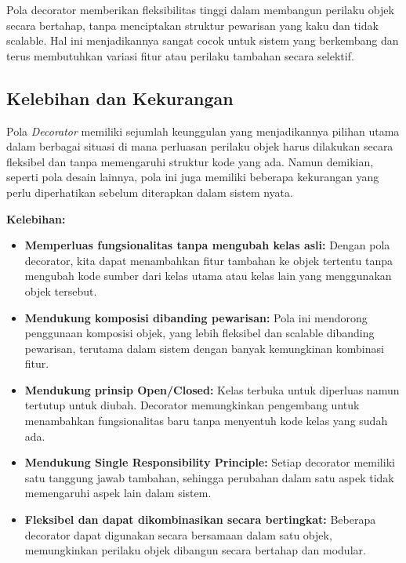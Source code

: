 Pola decorator memberikan fleksibilitas tinggi dalam membangun perilaku objek secara bertahap, tanpa menciptakan struktur pewarisan yang kaku dan tidak scalable. Hal ini menjadikannya sangat cocok untuk sistem yang berkembang dan terus membutuhkan variasi fitur atau perilaku tambahan secara selektif.

\subsection{Kelebihan dan Kekurangan}

Pola \textit{Decorator} memiliki sejumlah keunggulan yang menjadikannya pilihan utama dalam berbagai situasi di mana perluasan perilaku objek harus dilakukan secara fleksibel dan tanpa memengaruhi struktur kode yang ada. Namun demikian, seperti pola desain lainnya, pola ini juga memiliki beberapa kekurangan yang perlu diperhatikan sebelum diterapkan dalam sistem nyata.

\textbf{Kelebihan:}
\begin{itemize}
	\item \textbf{Memperluas fungsionalitas tanpa mengubah kelas asli:} Dengan pola decorator, kita dapat menambahkan fitur tambahan ke objek tertentu tanpa mengubah kode sumber dari kelas utama atau kelas lain yang menggunakan objek tersebut.
	
	\item \textbf{Mendukung komposisi dibanding pewarisan:} Pola ini mendorong penggunaan komposisi objek, yang lebih fleksibel dan scalable dibanding pewarisan, terutama dalam sistem dengan banyak kemungkinan kombinasi fitur.
	
	\item \textbf{Mendukung prinsip Open/Closed:} Kelas terbuka untuk diperluas namun tertutup untuk diubah. Decorator memungkinkan pengembang untuk menambahkan fungsionalitas baru tanpa menyentuh kode kelas yang sudah ada.
	
	\item \textbf{Mendukung Single Responsibility Principle:} Setiap decorator memiliki satu tanggung jawab tambahan, sehingga perubahan dalam satu aspek tidak memengaruhi aspek lain dalam sistem.
	
	\item \textbf{Fleksibel dan dapat dikombinasikan secara bertingkat:} Beberapa decorator dapat digunakan secara bersamaan dalam satu objek, memungkinkan perilaku objek dibangun secara bertahap dan modular.
\end{itemize}

